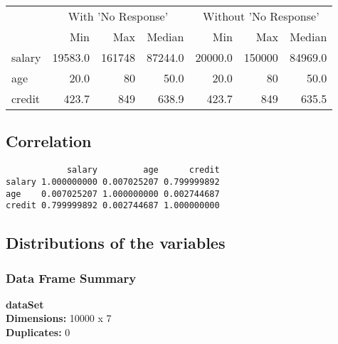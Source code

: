 \documentclass[
]{article}
\begin{document}
\begin{table}[H]
\centering
\begin{tabular}{l|r|r|r|r|r|r}
\hline
\multicolumn{1}{c|}{ } & \multicolumn{3}{c|}{With 'No Response'} & \multicolumn{3}{c}{Without 'No Response'} \\
\cline{2-4} \cline{5-7}
  & Min & Max & Median & Min & Max & Median\\
\hline
salary & 19583.0 & 161748 & 87244.0 & 20000.0 & 150000 & 84969.0\\
\hline
age & 20.0 & 80 & 50.0 & 20.0 & 80 & 50.0\\
\hline
credit & 423.7 & 849 & 638.9 & 423.7 & 849 & 635.5\\
\hline
\end{tabular}
\end{table}

\hypertarget{correlation}{%
\subsection{Correlation}\label{correlation}}

\begin{verbatim}
            salary         age      credit
salary 1.000000000 0.007025207 0.799999892
age    0.007025207 1.000000000 0.002744687
credit 0.799999892 0.002744687 1.000000000
\end{verbatim}

\hypertarget{distributions-of-the-variables-1}{%
\subsection{Distributions of the
variables}\label{distributions-of-the-variables-1}}

\hypertarget{data-frame-summary-1}{%
\subsubsection{Data Frame Summary}\label{data-frame-summary-1}}

\textbf{dataSet}\\
\textbf{Dimensions:} 10000 x 7\\
\textbf{Duplicates:} 0
\end{document}
